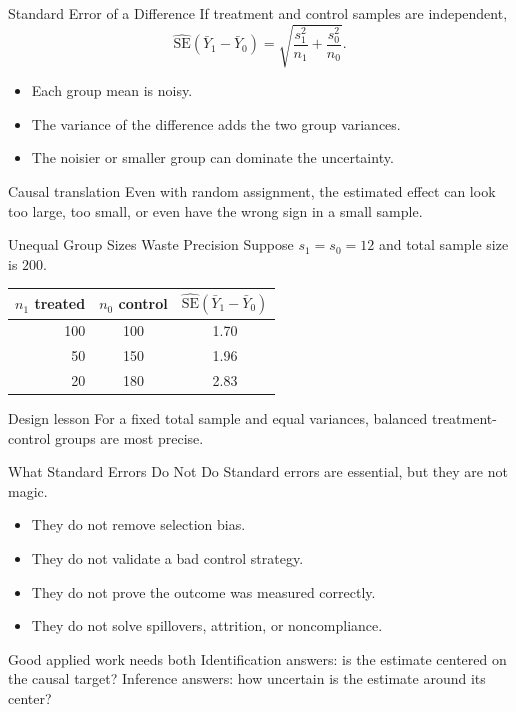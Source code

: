 \documentclass[11pt,aspectratio=169]{beamer}
\newcommand{\se}{\mathrm{SE}}
\newcommand{\derivbutton}[1]{\vspace{0.4em}\hfill\hyperlink{app:#1}{\beamerbutton{Appendix details}}}
\begin{document}
\begin{frame}{Standard Error of a Difference}
  \hypertarget{main:ate-se}{}
  If treatment and control samples are independent,
  \[
    \widehat{\se}(\bar{Y}_1-\bar{Y}_0)
    =
    \sqrt{\frac{s_1^2}{n_1}+\frac{s_0^2}{n_0}}.
  \]
  \begin{itemize}
    \item Each group mean is noisy.
    \item The variance of the difference adds the two group variances.
    \item The noisier or smaller group can dominate the uncertainty.
  \end{itemize}
  \begin{block}{Causal translation}
    Even with random assignment, the estimated effect can look too large, too small, or even have the wrong sign in a small sample.
  \end{block}
  \derivbutton{two-sample-se}
\end{frame}

\begin{frame}{Unequal Group Sizes Waste Precision}
  Suppose \(s_1=s_0=12\) and total sample size is \(200\).
  \begin{center}
  \begin{tabular}{rcc}
    \toprule
    \(n_1\) treated & \(n_0\) control & \(\widehat{\se}(\bar{Y}_1-\bar{Y}_0)\) \\
    \midrule
    100 & 100 & 1.70 \\
    50 & 150 & 1.96 \\
    20 & 180 & 2.83 \\
    \bottomrule
  \end{tabular}
  \end{center}
  \vspace{0.3em}
  \begin{block}{Design lesson}
    For a fixed total sample and equal variances, balanced treatment-control groups are most precise.
  \end{block}
\end{frame}

\begin{frame}{What Standard Errors Do Not Do}
  Standard errors are essential, but they are not magic.
  \begin{itemize}
    \item They do not remove selection bias.
    \item They do not validate a bad control strategy.
    \item They do not prove the outcome was measured correctly.
    \item They do not solve spillovers, attrition, or noncompliance.
  \end{itemize}
  \begin{block}{Good applied work needs both}
    Identification answers: is the estimate centered on the causal target? Inference answers: how uncertain is the estimate around its center?
  \end{block}
\end{frame}
\end{document}

